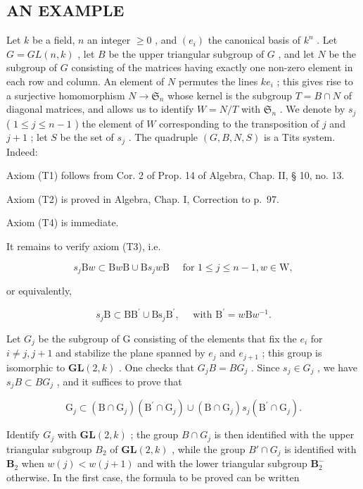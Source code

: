 \subsection{AN EXAMPLE}

Let \(k\) be a field, \(n\) an integer \(\geqslant 0\) , and \((e_i)\) the canonical basis of \(k^n\) . Let \(G = GL(n, k)\) , let \(B\) be the upper triangular subgroup of \(G\) , and let \(N\) be the subgroup of \(G\) consisting of the matrices having exactly one non-zero element in each row and column. An element of \(N\) permutes the lines \(ke_i\) ; this gives rise to a surjective homomorphism \(N \to \mathfrak{S}_n\) whose kernel is the subgroup \(T = B \cap N\) of diagonal matrices, and allows us to identify \(W = N/T\) with \(\mathfrak{S}_n\) . We denote by \(s_j\) ( \(1 \leqslant j \leqslant n - 1\) ) the element of \(W\) corresponding to the transposition of \(j\) and \(j + 1\) ; let \(S\) be the set of \(s_j\) . The quadruple \((G, B, N, S)\) is a Tits system. Indeed:

Axiom (T1) follows from Cor. 2 of Prop. 14 of Algebra, Chap. II, § 10, no. 13.

Axiom (T2) is proved in Algebra, Chap. I, Correction to p.~97.

Axiom (T4) is immediate.

It remains to verify axiom (T3), i.e.

\[
s _ {j} \mathrm{B} w \subset \mathrm{B} w \mathrm{B} \cup \mathrm{B} s _ {j} w \mathrm{B} \quad \text { for } 1 \leqslant j \leqslant n - 1, w \in \mathrm{W},
\]

or equivalently,

\[
s _ {j} \mathrm{B} \subset \mathrm{BB} ^ {\prime} \cup \mathrm{Bs} _ {j} \mathrm{B} ^ {\prime}, \quad \text { with } \mathrm{B} ^ {\prime} = w \mathrm{B} w ^ {- 1}.
\]

Let \(G_{j}\) be the subgroup of G consisting of the elements that fix the \(e_{i}\) for \(i \neq j, j + 1\) and stabilize the plane spanned by \(e_{j}\) and \(e_{j+1}\) ; this group is isomorphic to \(\mathbf{GL}(2, k)\) . One checks that \(G_{j}B = BG_{j}\) . Since \(s_{j} \in G_{j}\) , we have \(s_{j}B \subset BG_{j}\) , and it suffices to prove that

\[
\mathrm{G} _ {j} \subset (\mathrm{B} \cap \mathrm{G} _ {j}) (\mathrm{B} ^ {\prime} \cap \mathrm{G} _ {j}) \cup (\mathrm{B} \cap \mathrm{G} _ {j}) s _ {j} (\mathrm{B} ^ {\prime} \cap \mathrm{G} _ {j}).
\]

Identify \(G_{j}\) with \(\mathbf{GL}(2,k)\) ; the group \(B \cap G_{j}\) is then identified with the upper triangular subgroup \(B_{2}\) of \(\mathbf{GL}(2,k)\) , while the group \(B' \cap G_{j}\) is identified with \(\mathbf{B}_2\) when \(w(j) < w(j + 1)\) and with the lower triangular subgroup \(\mathbf{B}_2^-\) otherwise. In the first case, the formula to be proved can be written

